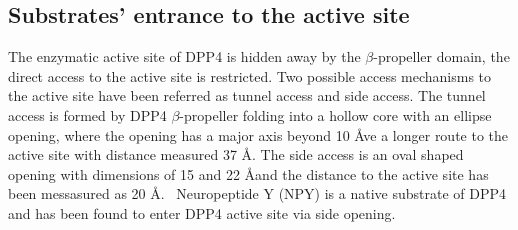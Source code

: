 \subsection{Substrates' entrance to the active site}

The enzymatic active site of DPP4 is hidden away by the $\beta$-propeller domain, the direct access to the active site is restricted. Two possible access mechanisms to the active site have been referred as tunnel access and side access. The tunnel access is formed by DPP4 $\beta$-propeller  folding into a hollow core with an ellipse opening, where the opening has a major axis beyond 10 \AA ve a longer route to the active site with distance measured 37 \AA. The side access is an oval shaped opening with dimensions of 15 and 22 \AA and the distance to the active site has been messasured as 20 \AA.~\cite{Engel_2003, Rasmussen_2002,Weihofen_2004} Neuropeptide Y (NPY) is a native substrate of DPP4 and has been found to enter DPP4 active site via side opening. ~\cite{Aertgeerts_2004}